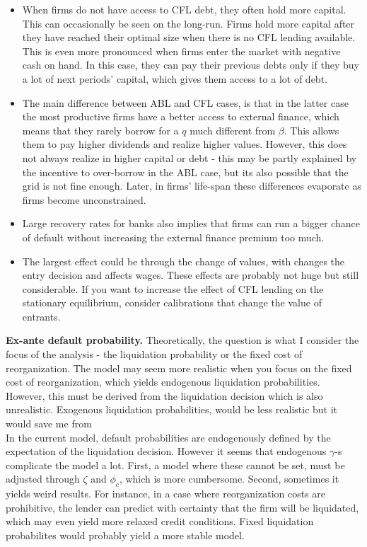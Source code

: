 \documentclass[12pt]{article}
\begin{document}
\begin{itemize}\setlength\itemsep{0em} \small
    \item When firms do not have access to CFL debt, they often hold more capital. This can occasionally be seen on the long-run. Firms hold more capital after they have reached their optimal size when there is no CFL lending available. This is even more pronounced when firms enter the market with negative cash on hand. In this case, they can pay their previous debts only if they buy a lot of next periods' capital, which gives them access to a lot of debt.
    \item The main difference between ABL and CFL cases, is that in the latter case the most productive firms have a better access to external finance, which means that they rarely borrow for a $q$ much different from $\beta$. This allows them to pay higher dividends and realize higher values. However, this does not always realize in higher capital or debt - this may be partly explained by the incentive to over-borrow in the ABL case, but its also possible that the grid is not fine enough. Later, in firms' life-span these differences evaporate as firms become unconstrained.
    \item Large recovery rates for banks also implies that firms can run a bigger chance of default without increasing the external finance premium too much.
    \item The largest effect could be through the change of values, with changes the entry decision and affects wages. These effects are probably not huge but still considerable. If you want to increase the effect of CFL lending on the stationary equilibrium, consider calibrations that change the value of entrants.
\end{itemize} \normalsize
\textbf{Ex-ante default probability.} Theoretically, the question is what I consider the focus of the analysis - the liquidation probability or the fixed cost of reorganization. The model may seem more realistic when you focus on the fixed cost of reorganization, which yields endogenous liquidation probabilities. However, this must be derived from the liquidation decision which is also unrealistic. Exogenous liquidation probabilities, would be less realistic but it would save me from \vspace{3mm} \\
In the current model, default probabilities are endogenously defined by the expectation of the liquidation decision. However it seems that endogenous $\gamma$-s complicate the model a lot. First, a model where these cannot be set, must be adjusted through $\zeta$ and $\phi_c$, which is more cumbersome. Second, sometimes it yields weird results. For instance, in a case where reorganization costs are prohibitive, the lender can predict with certainty that the firm will be liquidated, which may even yield more relaxed credit conditions. Fixed liquidation probabilites would probably yield a more stable model.
\end{document}
